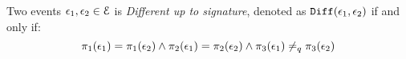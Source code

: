 %
%
%
\begin{defn}
Two events $\mathtt{\epsilon}_1, \mathtt{\epsilon}_2 \in \mathcal{E}$ is \emph{Different up to signature}, 
denoted as $\mathtt{Diff}(\mathtt{\epsilon}_1, \mathtt{\epsilon}_2)$ if and only if:
\[
\pi_1(\mathtt{\epsilon}_1) = \pi_1(\mathtt{\epsilon}_2) 
\land  
\pi_2(\mathtt{\epsilon}_1) = \pi_2(\mathtt{\epsilon}_2) 
\land  
\pi_3(\mathtt{\epsilon}_1) \neq_q \pi_3(\mathtt{\epsilon}_2)
\]
\end{defn}
%
%
%